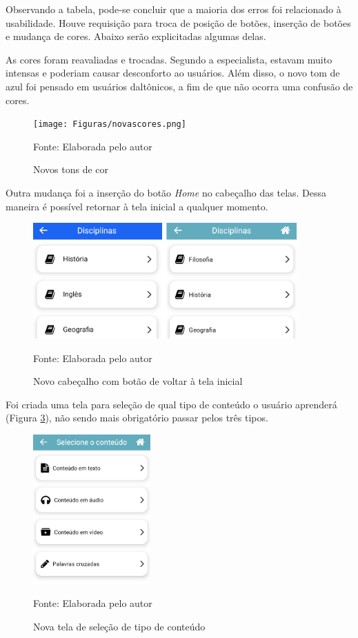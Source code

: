 Observando a tabela, pode-se concluir que a maioria dos erros foi relacionado à usabilidade. Houve requisição para troca de posição de botões, inserção de botões e mudança de cores. Abaixo serão explicitadas algumas delas.

As cores foram reavaliadas e trocadas. Segundo a especialista, estavam muito intensas e poderiam causar desconforto ao usuários. Além disso, o novo tom de azul foi pensado em usuários daltônicos, a fim de que não ocorra uma confusão de cores.

\begin{figure}[H]
\centering
    \caption{Novos tons de cor}
    \label{fig:novascores}
    \texttt{[image: Figuras/novascores.png]}
    
    Fonte: Elaborada pelo autor
\end{figure}

Outra mudança foi a inserção do botão \textit{Home} no cabeçalho das telas. Dessa maneira é possível retornar à tela inicial a qualquer momento.

\begin{figure}[H]
\centering
    \caption{Novo cabeçalho com botão de voltar à tela inicial}
    \label{fig:botaohome}
    \includegraphics[width=0.9\textwidth]{Figuras/botaohome.png}
    
    Fonte: Elaborada pelo autor
\end{figure}

Foi criada uma tela para seleção de qual tipo de conteúdo o usuário aprenderá (Figura \ref{fig:selecaoconteudo}), não sendo mais obrigatório passar pelos três tipos.

\begin{figure}[H]
\centering
    \caption{Nova tela de seleção de tipo de conteúdo}
    \label{fig:selecaoconteudo}
    \includegraphics[width=0.4\textwidth]{Figuras/selecaoconteudo.png}
    
    Fonte: Elaborada pelo autor
\end{figure}

